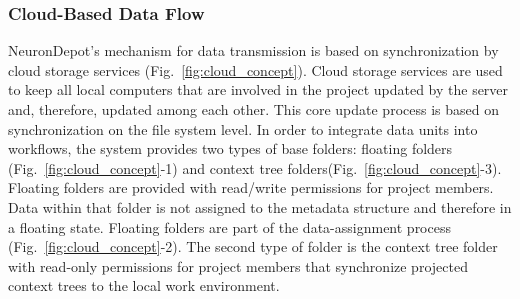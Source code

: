 \documentclass{frontiersSCNS} %
\begin{document}
\subsubsection{Cloud-Based Data Flow}

NeuronDepot's mechanism for data transmission is based on synchronization by
cloud storage services (Fig.~\ref{fig:cloud_concept}). Cloud storage services
are used to keep all local computers that are involved in the project updated
by the server and, therefore, updated among each other. This core update
process is based on synchronization on the file system level. In order to
integrate data units into workflows, the system provides two types of base
folders: floating folders (Fig.~\ref{fig:cloud_concept}-1) and context tree
folders(Fig.~\ref{fig:cloud_concept}-3). Floating folders are provided with
read/write permissions for project members. Data within that folder is not
assigned to the metadata structure and therefore in a floating state. Floating
folders are part of the data-assignment process
(Fig.~\ref{fig:cloud_concept}-2). The second type of folder is the context
tree folder with read-only permissions for project members that synchronize
projected context trees to the local work environment.
\end{document}
